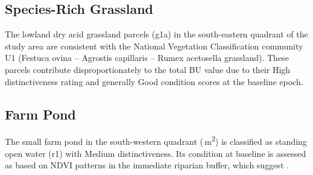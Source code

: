 \subsection{Species-Rich Grassland}

The lowland dry acid grassland parcels (g1a) in the south-eastern quadrant of the study area are consistent with the National Vegetation Classification community U1 (Festuca ovina -- Agrostis capillaris -- Rumex acetosella grassland). These parcels contribute disproportionately to the total BU value due to their High distinctiveness rating and generally Good condition scores at the baseline epoch.

\subsection{Farm Pond}

The small farm pond in the south-western quadrant (\,m\textsuperscript{2}) is classified as standing open water (r1) with Medium distinctiveness. Its condition at baseline is assessed as  based on NDVI patterns in the immediate riparian buffer, which suggest .
